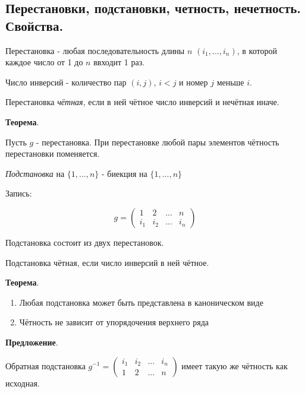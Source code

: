 \documentclass[a4paper]{article}
\begin{document}
\subsection*{Перестановки, подстановки, четность, нечетность. Свойства.}

 Перестановка - любая последовательность длины $n$ $(i_1, ..., i_n)$, в которой каждое число от 1 до $n$ ввходит 1 раз.

 Число инверсий - количество пар $(i,j)$, $i < j$ и номер $j$ меньше $i$.

 Перестановка \textit{чётная}, если в ней чётное число инверсий и нечётная иначе.

\begin{htheorem}\textbf{Теорема}.

Пусть $g$ - перестановка. При перестановке любой пары элементов чётность перестановки поменяется.
\end{htheorem}


 \textit{Подстановка} на $\{ 1, ..., n\}$ - биекция на $\{ 1, ..., n\}$

Запись: 

\[ g = \begin{pmatrix}
1 & 2 & ... & n \\ i_1 & i_2 & ... & i_n
\end{pmatrix}
\]

Подстановка состоит из двух перестановок.

Подстановка чётная, если число инверсий в ней чётное.

\begin{htheorem}\textbf{Теорема}.


\end{htheorem}
\begin{enumerate}
\item Любая подстановка может быть представлена в каноническом виде
\item Чётность не зависит от упорядочения верхнего ряда
\end{enumerate}

\begin{htheorem}\textbf{Предложение}.

Обратная подстановка $g^{-1} = \begin{pmatrix}
i_1 & i_2 & ... & i_n \\ 1 & 2 & ... & n
\end{pmatrix}$ имеет такую же чётность как исходная.

\end{htheorem}
\end{document}
